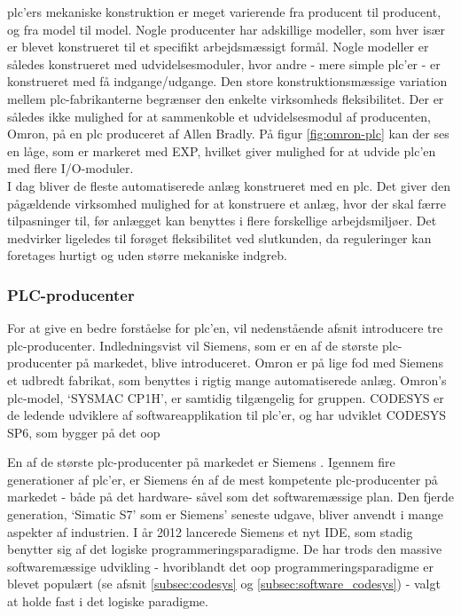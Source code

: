 
\noindent \gls{plc}'ers mekaniske konstruktion er meget varierende fra producent til producent, og fra model til model. Nogle producenter har adskillige modeller, som hver især er blevet konstrueret til et specifikt arbejdsmæssigt formål. Nogle modeller er således konstrueret med udvidelsesmoduler, hvor andre - mere simple \gls{plc}'er - er konstrueret med få indgange/udgange. 
Den store konstruktionsmæssige variation mellem \gls{plc}-fabrikanterne begrænser den enkelte virksomheds fleksibilitet. Der er således ikke mulighed for at sammenkoble et udvidelsesmodul af producenten, Omron, på en \gls{plc} produceret af Allen Bradly\cite{PLC-comb}. På figur \ref{fig:omron-plc} kan der ses en låge, som er markeret med EXP, hvilket giver mulighed for at udvide \gls{plc}'en med flere I/O-moduler.\\

\noindent I dag bliver de fleste automatiserede anlæg konstrueret med en \gls{plc}. Det giver den pågældende virksomhed mulighed for at konstruere et anlæg, hvor der skal færre tilpasninger til, før anlægget kan benyttes i flere forskellige arbejdsmiljøer. Det medvirker ligeledes til forøget fleksibilitet ved slutkunden, da reguleringer kan foretages hurtigt og uden større mekaniske indgreb.

\subsubsection{PLC-producenter}
\label{sec:plc}
\noindent For at give en bedre forståelse for \gls{plc}'en, vil nedenstående afsnit introducere tre \gls{plc}-producenter. Indledningsvist vil Siemens, som er en af de største \gls{plc}-producenter på markedet, blive introduceret. Omron er på lige fod med Siemens et udbredt fabrikat, som benyttes i rigtig mange automatiserede anlæg. Omron's \gls{plc}-model, \enquote*{SYSMAC CP1H}, er samtidig tilgængelig for gruppen. CODESYS er de ledende udviklere af softwareapplikation til \gls{plc}'er, og har udviklet CODESYS SP6, som bygger på det \gls{oop}

\label{subsec:siemens}
\noindent En af de største \gls{plc}-producenter på markedet er Siemens \cite{plc-marked-shares}. Igennem fire generationer af \gls{plc}'er, er Siemens én af de mest kompetente \gls{plc}-producenter på markedet - både på det hardware- såvel som det softwaremæssige plan. Den fjerde generation, \enquote*{Simatic S7} som er Siemens' seneste udgave, bliver anvendt i mange aspekter af industrien. I år 2012 lancerede Siemens et nyt IDE, som stadig benytter sig af det logiske programmeringsparadigme. De har trods den massive softwaremæssige udvikling - hvoriblandt det \gls{oop} programmeringsparadigme er blevet populært (se afsnit \ref{subsec:codesys} og \ref{subsec:software_codesys}) - valgt at holde fast i det logiske paradigme. \\

